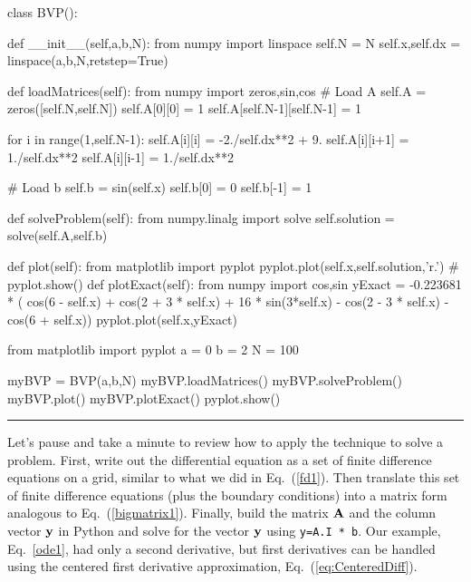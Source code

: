 \begin{codeexample}
\begin{VerbatimOut}{\listingFile}
class BVP():

    def __init__(self,a,b,N):
        from numpy import linspace
        self.N = N
        self.x,self.dx = linspace(a,b,N,retstep=True)


    def loadMatrices(self):
        from numpy import zeros,sin,cos
        # Load A
        self.A = zeros([self.N,self.N])
        self.A[0][0] = 1
        self.A[self.N-1][self.N-1] = 1

        for i in range(1,self.N-1):
            self.A[i][i] = -2./self.dx**2 + 9.
            self.A[i][i+1] = 1./self.dx**2
            self.A[i][i-1] = 1./self.dx**2

        # Load b
        self.b = sin(self.x)
        self.b[0] = 0
        self.b[-1] = 1

    def solveProblem(self):
        from numpy.linalg import solve
        self.solution = solve(self.A,self.b)

    def plot(self):
        from matplotlib import pyplot
        pyplot.plot(self.x,self.solution,'r.')
        #        pyplot.show()
    def plotExact(self):
        from numpy import cos,sin
        yExact = -0.223681 * ( cos(6 - self.x) + cos(2 + 3 * self.x) + 16 * sin(3*self.x) - cos(2 - 3 * self.x) - cos(6 + self.x))
        pyplot.plot(self.x,yExact)

from matplotlib import pyplot
a = 0
b = 2
N = 100

myBVP = BVP(a,b,N)
myBVP.loadMatrices()
myBVP.solveProblem()
myBVP.plot()
myBVP.plotExact()
pyplot.show()
\end{VerbatimOut}
\end{codeexample}
\else
\noindent\rule{5 in}{0.01 in}
\fi

Let's pause and take a minute to review how to apply the technique to
solve a problem. First, write out the differential equation as a set
of finite difference equations on a grid, similar to what we did in
Eq.~(\ref{fd1}). Then translate this set of finite difference
equations (plus the boundary conditions) into a matrix form analogous
to Eq.~(\ref{bigmatrix1}).  Finally, build the matrix ${\bf A}$ and
the column vector ${\bf y}$ in Python and solve for the vector ${\bf
y}$ using {\tt y=A.I * b}. Our example, Eq.~\eqref{ode1}, had
only a second derivative, but first derivatives can be handled using
the centered first derivative approximation,
Eq.~(\ref{eq:CenteredDiff}).


